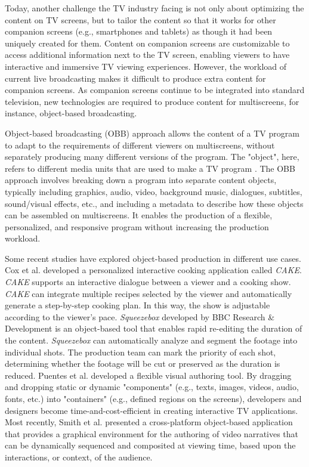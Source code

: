 \documentclass[sigchi-a, authorversion]{acmart}
\begin{document}
Today, another challenge the TV industry facing is not only about optimizing the content on TV screens, but to tailor the content so that it works for other companion screens (e.g., smartphones and tablets) as though it had been uniquely created for them. Content on companion screens are customizable to access additional information next to the TV screen, enabling viewers to have interactive and immersive TV viewing experiences\cite{bentley2017, dowell2015}. However, the workload of current live broadcasting makes it difficult to produce extra content for companion screens. As companion screens continue to be integrated into standard television, new technologies are required to produce content for multiscreens, for instance, object-based broadcasting\cite{li2018, armstrong2014}.

Object-based broadcasting (OBB) approach allows the content of a TV program to adapt to the requirements of different viewers on multiscreens, without separately producing many different versions of the program. The "object", here, refers to different media units that are used to make a TV program \cite{armstrong2014}. The OBB approach involves breaking down a program into separate content objects, typically including graphics, audio, video, background music, dialogues, subtitles, sound/visual effects, etc., and including a metadata to describe how these objects can be assembled on multiscreens. It enables the production of a flexible, personalized, and responsive program without increasing the production workload\cite{kegel2017, williams2016}.

Some recent studies have explored object-based production in different use cases. Cox et al. \cite{cox2017} developed a personalized interactive cooking application called \textit{CAKE}. \textit{CAKE} supports an interactive dialogue between a viewer and a cooking show. \textit{CAKE} can integrate multiple recipes selected by the viewer and automatically generate a step-by-step cooking plan. In this way, the show is adjustable according to the viewer's pace. \textit{Squeezebox} developed by BBC Research \& Development \cite{BBC2015} is an object-based tool that enables rapid re-editing the duration of the content. \textit{Squeezebox} can automatically analyze and segment the footage into individual shots. The production team can mark the priority of each shot, determining whether the footage will be cut or preserved as the duration is reduced. Puentes et al. \cite{puentes2017} developed a flexible visual authoring tool. By dragging and dropping static or dynamic "components" (e.g., texts, images, videos, audio, fonts, etc.) into "containers" (e.g., defined regions on the screens), developers and designers become time-and-cost-efficient in creating interactive TV applications. Most recently, Smith et al. \cite{smith2018} presented a cross-platform object-based application that provides a graphical environment for the authoring of video narratives that can be dynamically sequenced and composited at viewing time, based upon the interactions, or context, of the audience.
\end{document}
